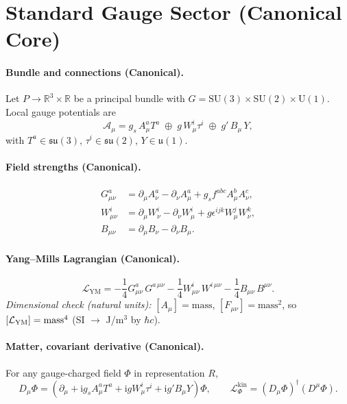 \documentclass[11pt]{article}
\newcommand{\ii}{\mathrm{i}}
\newcommand{\GsA}{G^a_{\mu\nu}}
\newcommand{\WsI}{W^i_{\mu\nu}}
\newcommand{\Bmn}{B_{\mu\nu}}
\begin{document}
\section{Standard Gauge Sector (Canonical Core)}
\label{sec:gauge_core}

\paragraph{Bundle and connections (Canonical).}
Let $P\!\to\! \mathbb{R}^{3}\times\mathbb{R}$ be a principal bundle with
$G=\mathrm{SU}(3)\times\mathrm{SU}(2)\times\mathrm{U}(1)$.
Local gauge potentials are
\[
	\mathcal{A}_\mu
	= g_s\,A^a_\mu T^a \;\oplus\; g\,W^i_\mu \tau^i \;\oplus\; g'\,B_\mu\,Y,
\]
with $T^a\in\mathfrak{su}(3)$, $\tau^i\in\mathfrak{su}(2)$, $Y\in\mathfrak u(1)$.

\paragraph{Field strengths (Canonical).}
\begin{align}
	G^a_{\mu\nu} &= \partial_\mu A^a_\nu-\partial_\nu A^a_\mu + g_s f^{abc} A^b_\mu A^c_\nu,\label{eq:Gmunu}\\
	W^i_{\mu\nu} &= \partial_\mu W^i_\nu-\partial_\nu W^i_\mu + g \epsilon^{ijk} W^j_\mu W^k_\nu,\label{eq:Wmunu}\\
	B_{\mu\nu} &= \partial_\mu B_\nu-\partial_\nu B_\mu.\label{eq:Bmunu}
\end{align}

\paragraph{Yang--Mills Lagrangian (Canonical).}
\begin{equation}
	\mathcal{L}_{\text{YM}}
	= -\frac{1}{4} \GsA \, G^{a\,\mu\nu}
	-\frac{1}{4} \WsI \, W^{i\,\mu\nu}
	-\frac{1}{4} \Bmn \, B^{\mu\nu}.
	\label{eq:YM-core}
\end{equation}
\textit{Dimensional check (natural units):} $[A_\mu]=\text{mass}$, $[F_{\mu\nu}]=\text{mass}^2$, so $[\mathcal L_{\rm YM}]=\text{mass}^4$ (SI $\to$ J/m$^3$ by \(\hbar c\)).

\paragraph{Matter, covariant derivative (Canonical).}
For any gauge-charged field $\Phi$ in representation $R$,
\begin{equation}
	D_\mu \Phi
	= \left(\partial_\mu + \ii g_s A^a_\mu T^a
	+ \ii g W^i_\mu \tau^i
	+ \ii g' B_\mu Y \right)\Phi,
	\qquad
	\mathcal{L}_{\Phi}^{\text{kin}}=(D_\mu\Phi)^\dagger (D^\mu\Phi).
	\label{eq:covder}
\end{equation}
\end{document}
